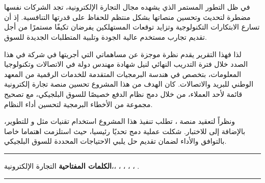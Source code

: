 \chapter*{}

\begin{RLtext}
 \noindent\hspace{10pt} 
 في ظل التطور المستمر الذي يشهده مجال التجارة الإلكترونية، تجد الشركات نفسها مضطرة لتحديث وتحسين منصاتها بشكل منتظم للحفاظ على قدرتها التنافسية. إذ أن تسارع الابتكارات التكنولوجية وتزايد توقعات المستهلكين يفرضان تكيفًا مستمرًا من أجل تقديم تجارب مستخدم عالية الجودة وتلبية المتطلبات الجديدة للسوق.

 \vspace{10pt}

 لذا فهذا التقرير يقدم نظرة موجزة عن مساهماتي التي أجريتها في شركة  في هذا الصدد خلال فترة التدريب النهائي لنيل شهادة مهندس دولة في الاتصالات وتكنولوجيا المعلومات، بتخصص في هندسة البرمجيات المتقدمة للخدمات الرقمية من المعهد الوطني للبريد والاتصالات. كان الهدف من هذا المشروع تحسين منصة تجارة إلكترونية قائمة لأحد العملاء، من خلال دمج نظام الدفع  خصيصًا للسوق البلجيكي، مع تصحيح مجموعة من الأخطاء البرمجية لتحسين أداء النظام.
 \vspace{10pt}

 ونظراً لتعقيد منصة ، تطلب تنفيذ هذا المشروع استخدام تقنيات مثل  و للتطوير، بالإضافة إلى  للاختبار. شكلت عملية دمج  تحديًا رئيسيا، حيث استلزمت اهتماما خاصا بالتوافق والأداء لضمان تقديم حل يلبي الاحتياجات المحددة للسوق البلجيكي.

 \vspace{10pt}
\end{RLtext}

\noindent\rule[2pt]{\textwidth}{0.5pt}

\noindent
\begin{RLtext}
    \textbf{الكلمات المفتاحية\LR{:}} التجارة الإلكترونية،، ، ، ، ، .
\end{RLtext}

\noindent\rule[2pt]{\textwidth}{0.5pt}
